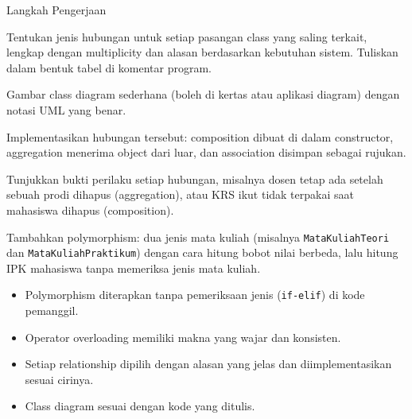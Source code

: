 \begin{langkah}{Langkah Pengerjaan}
  \item Tentukan jenis hubungan untuk setiap pasangan class yang saling terkait, lengkap dengan multiplicity dan alasan berdasarkan kebutuhan sistem. Tuliskan dalam bentuk tabel di komentar program.
  \item Gambar class diagram sederhana (boleh di kertas atau aplikasi diagram) dengan notasi UML yang benar.
  \item Implementasikan hubungan tersebut: composition dibuat di dalam constructor, aggregation menerima object dari luar, dan association disimpan sebagai rujukan.
  \item Tunjukkan bukti perilaku setiap hubungan, misalnya dosen tetap ada setelah sebuah prodi dihapus (aggregation), atau KRS ikut tidak terpakai saat mahasiswa dihapus (composition).
  \item Tambahkan polymorphism: dua jenis mata kuliah (misalnya \texttt{MataKuliahTeori} dan \texttt{MataKuliahPraktikum}) dengan cara hitung bobot nilai berbeda, lalu hitung IPK mahasiswa tanpa memeriksa jenis mata kuliah.
\end{langkah}

\begin{penting}
\begin{itemize}
  \item Polymorphism diterapkan tanpa pemeriksaan jenis (\texttt{if-elif}) di kode pemanggil.
  \item Operator overloading memiliki makna yang wajar dan konsisten.
  \item Setiap relationship dipilih dengan alasan yang jelas dan diimplementasikan sesuai cirinya.
  \item Class diagram sesuai dengan kode yang ditulis.
\end{itemize}
\end{penting}